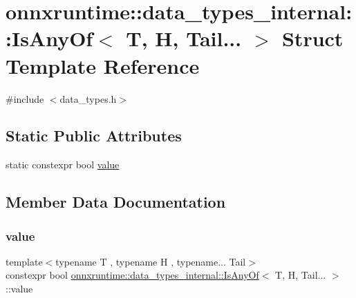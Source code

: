 \hypertarget{structonnxruntime_1_1data__types__internal_1_1IsAnyOf_3_01T_00_01H_00_01Tail_8_8_8_01_4}{}\section{onnxruntime\+:\+:data\+\_\+types\+\_\+internal\+:\+:Is\+Any\+Of$<$ T, H, Tail... $>$ Struct Template Reference}
\label{structonnxruntime_1_1data__types__internal_1_1IsAnyOf_3_01T_00_01H_00_01Tail_8_8_8_01_4}


{\ttfamily \#include $<$data\+\_\+types.\+h$>$}

\subsection*{Static Public Attributes}
\begin{DoxyCompactItemize}
\item 
static constexpr bool \mbox{\hyperlink{structonnxruntime_1_1data__types__internal_1_1IsAnyOf_3_01T_00_01H_00_01Tail_8_8_8_01_4_a352824d65827bbd08eb0035f5f11571f}{value}}
\end{DoxyCompactItemize}


\subsection{Member Data Documentation}
\mbox{\label{structonnxruntime_1_1data__types__internal_1_1IsAnyOf_3_01T_00_01H_00_01Tail_8_8_8_01_4_a352824d65827bbd08eb0035f5f11571f}} 
\subsubsection{\texorpdfstring{value}{value}}
{\footnotesize\ttfamily template$<$typename T , typename H , typename... Tail$>$ \\
constexpr bool \mbox{\hyperlink{structonnxruntime_1_1data__types__internal_1_1IsAnyOf}{onnxruntime\+::data\+\_\+types\+\_\+internal\+::\+Is\+Any\+Of}}$<$ T, H, Tail... $>$\+::value\hspace{0.3cm}{\ttfamily [static]}}

